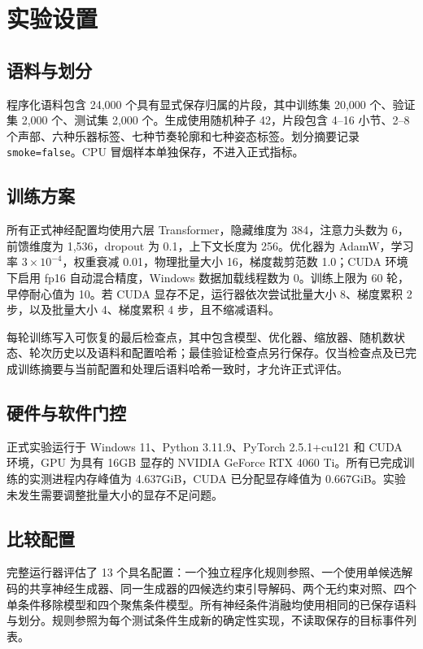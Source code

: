 \section{实验设置}
\label{sec:experiments-zh}

\subsection{语料与划分}

程序化语料包含 24,000 个具有显式保存归属的片段，其中训练集 20,000 个、验证集 2,000 个、测试集 2,000 个。生成使用随机种子 42，片段包含 4--16 小节、2--8 个声部、六种乐器标签、七种节奏轮廓和七种姿态标签。划分摘要记录 \texttt{smoke=false}。CPU 冒烟样本单独保存，不进入正式指标。

\subsection{训练方案}

所有正式神经配置均使用六层 Transformer，隐藏维度为 384，注意力头数为 6，前馈维度为 1,536，dropout 为 0.1，上下文长度为 256。优化器为 AdamW，学习率 $3\times10^{-4}$，权重衰减 0.01，物理批量大小 16，梯度裁剪范数 1.0；CUDA 环境下启用 fp16 自动混合精度，Windows 数据加载线程数为 0。训练上限为 60 轮，早停耐心值为 10。若 CUDA 显存不足，运行器依次尝试批量大小 8、梯度累积 2 步，以及批量大小 4、梯度累积 4 步，且不缩减语料。

每轮训练写入可恢复的最后检查点，其中包含模型、优化器、缩放器、随机数状态、轮次历史以及语料和配置哈希；最佳验证检查点另行保存。仅当检查点及已完成训练摘要与当前配置和处理后语料哈希一致时，才允许正式评估。

\subsection{硬件与软件门控}

正式实验运行于 Windows 11、Python 3.11.9、PyTorch 2.5.1+cu121 和 CUDA 环境，GPU 为具有 16GB 显存的 NVIDIA GeForce RTX 4060 Ti。所有已完成训练的实测进程内存峰值为 4.637GiB，CUDA 已分配显存峰值为 0.667GiB。实验未发生需要调整批量大小的显存不足问题。

\subsection{比较配置}

完整运行器评估了 13 个具名配置：一个独立程序化规则参照、一个使用单候选解码的共享神经生成器、同一生成器的四候选约束引导解码、两个无约束对照、四个单条件移除模型和四个聚焦条件模型。所有神经条件消融均使用相同的已保存语料与划分。规则参照为每个测试条件生成新的确定性实现，不读取保存的目标事件列表。

